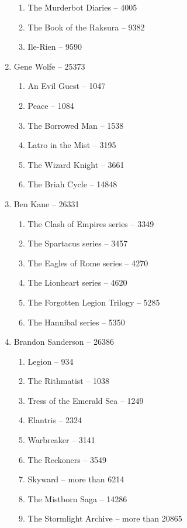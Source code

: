\documentclass[a4paper, 11pt]{proc} %
\begin{document}
\begin{enumerate}
\begin{enumerate}
            \item The Murderbot Diaries -- 4005
            \item The Book of the Raksura -- 9382
            \item Ile-Rien -- 9590
        \end{enumerate}
    \item Gene Wolfe -- 25373
        \begin{enumerate}
            \item An Evil Guest -- 1047
            \item Peace -- 1084
            \item The Borrowed Man -- 1538
            \item Latro in the Mist -- 3195
            \item The Wizard Knight -- 3661
            \item The Briah Cycle -- 14848
        \end{enumerate}
    \item Ben Kane -- 26331
        \begin{enumerate}
            \item The Clash of Empires series -- 3349
            \item The Spartacus series -- 3457
            \item The Eagles of Rome series -- 4270
            \item The Lionheart series -- 4620
            \item The Forgotten Legion Trilogy -- 5285
            \item The Hannibal series -- 5350
        \end{enumerate}
    \item Brandon Sanderson -- 26386
        \begin{enumerate}
            \item Legion -- 934
            \item The Rithmatist -- 1038
            \item Tress of the Emerald Sea -- 1249
            \item Elantris -- 2324
            \item Warbreaker -- 3141
            \item The Reckoners -- 3549
            \item Skyward -- more than 6214
            \item The Mistborn Saga -- 14286
            \item The Stormlight Archive -- more than 20865

\end{enumerate}
\end{enumerate}
\end{document}
